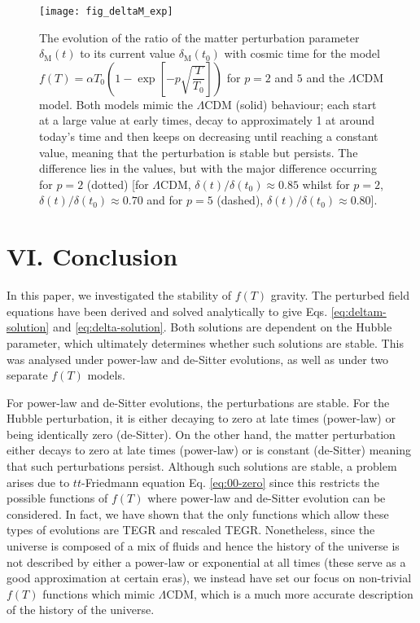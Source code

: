 \documentclass[prl,floatfix,showpacs,twocolumn,preprintnumbers,amsmath,amssymb,superscriptaddress]{revtex4}
\begin{document}
\begin{figure}[h!]
\texttt{[image: fig\_deltaM\_exp]}
\caption{The evolution of the ratio of the matter perturbation parameter $\delta_\text{M}(t)$ to its current value $\delta_\text{M} \left(t_0\right)$ with cosmic time for the model $f(T) =\alpha T_0 \left(1 - \exp \left[-p \sqrt{\dfrac{T}{T_0}}\right]\right)$ for $p = 2$ and $5$ and the $\Lambda$CDM model. Both models mimic the $\Lambda$CDM (solid) behaviour; each start at a large value at early times, decay to approximately 1 at around today's time and then keeps on decreasing until reaching a constant value, meaning that the perturbation is stable but persists. The difference lies in the values, but with the major difference occurring for $p = 2$ (dotted) [for $\Lambda$CDM, $\delta(t)/\delta\left(t_0\right) \approx 0.85$ whilst for $p = 2$, $\delta(t)/\delta\left(t_0\right) \approx 0.70$ and for $p = 5$ (dashed), $\delta(t)/\delta\left(t_0\right) \approx 0.80$].}
\label{fig:fig_deltaM_exp}
\end{figure}

\section{VI. Conclusion}

In this paper, we investigated the stability of $f(T)$ gravity. The perturbed field equations have been derived and solved analytically to give Eqs. \eqref{eq:deltam-solution} and \eqref{eq:delta-solution}. Both solutions are dependent on the Hubble parameter, which ultimately determines whether such solutions are stable. This was analysed under power-law and de-Sitter evolutions, as well as under two separate $f(T)$ models.

For power-law and de-Sitter evolutions, the perturbations are stable. For the Hubble perturbation, it is either decaying to zero at late times (power-law) or being identically zero (de-Sitter). On the other hand, the matter perturbation either decays to zero at late times (power-law) or is constant (de-Sitter) meaning that such perturbations persist. Although such solutions are stable, a problem arises due to $tt$-Friedmann equation Eq. \eqref{eq:00-zero} since this restricts the possible functions of $f(T)$ where power-law and de-Sitter evolution can be considered. In fact, we have shown that the only functions which allow these types of evolutions are TEGR and rescaled TEGR. Nonetheless, since the universe is composed of a mix of fluids and hence the history of the universe is not described by either a power-law or exponential at all times (these serve as a good approximation at certain eras), we instead have set our focus on non-trivial $f(T)$ functions which mimic $\Lambda$CDM, which is a much more accurate description of the history of the universe.
\end{document}
